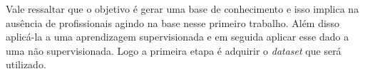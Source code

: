 Vale ressaltar que o objetivo é gerar uma base de conhecimento e isso implica na ausência de profissionais agindo na base nesse primeiro trabalho. Além disso aplicá-la a uma aprendizagem supervisionada e em seguida aplicar esse dado a uma não supervisionada. Logo a primeira etapa é adquirir o \textit{dataset} que será utilizado.






